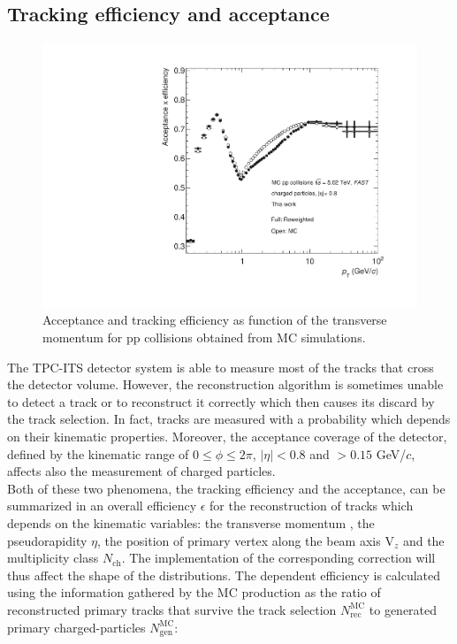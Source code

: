 \documentclass[12pt,a4paper]{report}
\begin{document}
\subsection{Tracking efficiency and acceptance}
\begin{figure}[tb!]
\centering
\includegraphics[width=12cm]{Plots/trckEffpp.pdf}  
\caption{Acceptance and tracking efficiency as function of the transverse momentum for pp collisions obtained from MC simulations.}
\label{trckEffpp}
\end{figure}
The TPC-ITS detector system is able to measure most of the tracks that cross the detector volume. However, the reconstruction algorithm is sometimes unable to detect a track or to reconstruct it correctly which then causes its discard by the track selection. In fact, tracks are measured with a probability which depends on their kinematic properties. Moreover, the acceptance coverage of the detector, defined by the kinematic range of $0 \leq \phi \leq 2\pi$, $|\eta| < 0.8$ and \pt $> 0.15$ GeV/$c$, affects also the measurement of charged particles. \\
Both of these two phenomena, the tracking efficiency and the acceptance, can be summarized in an overall efficiency $\epsilon$ for the reconstruction of tracks which depends on the kinematic variables: the transverse momentum \pt, the pseudorapidity $\eta$, the position of primary vertex along the beam axis $\text{V}_z$ and the multiplicity class $N_\text{ch}$. The implementation of the corresponding correction will thus affect the shape of the \pt distributions. The \pt dependent efficiency is calculated using the information gathered by the MC production as the ratio of reconstructed primary tracks that survive the track selection $N_\text{rec}^\text{MC}$ to generated primary charged-particles $N_\text{gen}^\text{MC}$: 
\end{document}
